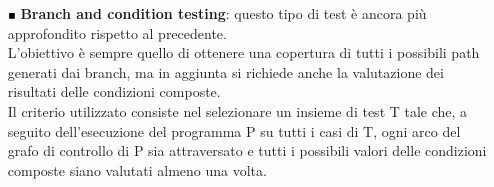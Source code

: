 \begin{itemize}
\begin{itemize}
\item [$ \Blacksquare $] \textbf{Branch and condition testing}: questo tipo di test è ancora più approfondito rispetto al precedente.\\
L'obiettivo è sempre quello di ottenere una copertura di tutti i possibili path generati dai branch, ma in aggiunta si richiede anche la valutazione dei risultati delle condizioni composte.\\
Il criterio utilizzato consiste nel selezionare un insieme di test T tale che, a seguito dell’esecuzione del programma P su tutti i casi di T, ogni arco del grafo di controllo di P sia attraversato e tutti i possibili valori delle condizioni composte siano valutati almeno una volta.\\
\end{itemize}

\end{itemize}
